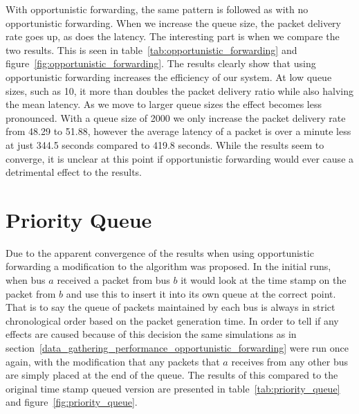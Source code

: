         With opportunistic forwarding, the same pattern is followed as with no opportunistic forwarding. When we increase the queue size, the packet delivery rate goes up, as does the latency. The interesting part is when we compare the two results. This is seen in table~\ref{tab:opportunistic_forwarding} and figure~\ref{fig:opportunistic_forwarding}. The results clearly show that using opportunistic forwarding increases the efficiency of our system. At low queue sizes, such as 10, it more than doubles the packet delivery ratio while also halving the mean latency. As we move to larger queue sizes the effect becomes less pronounced. With a queue size of 2000 we only increase the packet delivery rate from 48.29 to 51.88, however the average latency of a packet is over a minute less at just 344.5 seconds compared to 419.8 seconds. While the results seem to converge, it is unclear at this point if opportunistic forwarding would ever cause a detrimental effect to the results. 


    \section{Priority Queue}\label{data_gathering_performance_priority_queue}

        Due to the apparent convergence of the results when using opportunistic forwarding a modification to the algorithm was proposed. In the initial runs, when bus $a$ received a packet from bus $b$ it would look at the time stamp on the packet from $b$ and use this to insert it into its own queue at the correct point. That is to say the queue of packets maintained by each bus is always in strict chronological order based on the packet generation time. In order to tell if any effects are caused because of this decision the same simulations as in section~\ref{data_gathering_performance_opportunistic_forwarding} were run once again, with the modification that any packets that $a$ receives from any other bus are simply placed at the end of the queue. The results of this compared to the original time stamp queued version are presented in table~\ref{tab:priority_queue} and figure~\ref{fig:priority_queue}.

